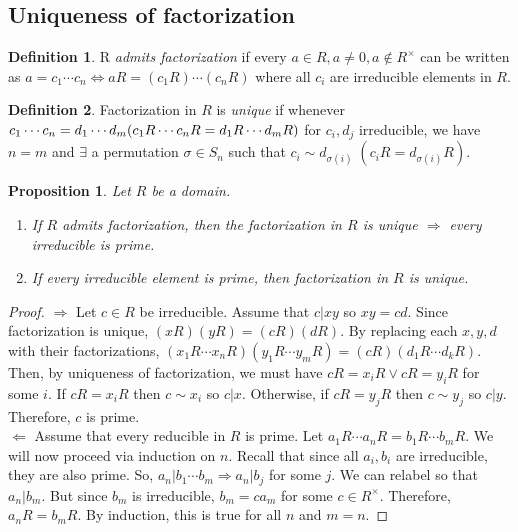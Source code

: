 \documentclass{article}
\theoremstyle{definition}
\newtheorem{definition}{Definition}[subsection]
\theoremstyle{remark}
\theoremstyle{plain}
\newtheorem{prop}{Proposition}[subsection]
\begin{document}
\subsection{Uniqueness of factorization}

\begin{definition}
    R \emph{admits factorization} if every \(a \in R, a\neq 0, a\notin R^{\times}\) can be written
    as \(a = c_1\cdots c_n \iff aR = (c_1R)\cdots(c_nR)\) where all \(c_i\) are irreducible elements in \(R\).
\end{definition}

\begin{definition}
    Factorization in \(R\) is \emph{unique} if whenever \(c_1\cdots c_n = d_1\cdots d_m \\(c_1R\cdots c_nR = d_1R\cdots d_mR)\) for \(c_i, d_j\) irreducible, we have \(n = m\) and \(\exists\)
    a permutation \(\sigma \in S_n\) such that \(c_i \sim d_{\sigma(i)}\; (c_iR = d_{\sigma(i)}R)\).
\end{definition}

\begin{prop}
    Let \(R\) be a domain. 
    \begin{enumerate}
        \item If \(R\) admits factorization, then the factorization in \(R\) is unique \(\Rightarrow\) every irreducible is prime.
        \item If every irreducible element is prime, then factorization in \(R\) is unique. 
    \end{enumerate}
\end{prop}

\begin{proof}
    \(\Rightarrow\) Let \(c \in R\) be irreducible. Assume that \(c|xy\) so \(xy = cd\). Since factorization is unique, \((xR)(yR) = (cR)(dR)\). By replacing each \(x, y, d\) with their factorizations,
    \((x_1R\cdots x_nR)(y_1R\cdots y_mR) = (cR)(d_1R \cdots d_kR)\). Then, by uniqueness of factorization, we must have \(cR = x_iR \lor cR = y_iR\) for some \(i\). If \(cR = x_iR\) then \(c\sim x_i\) 
    so \(c|x\). Otherwise, if \(cR = y_jR\) then \(c \sim y_j\) so \(c|y\). Therefore, \(c\) is prime.\\
    \(\Leftarrow\) Assume that every reducible in \(R\) is prime. Let \(a_1R\cdots a_nR = b_1R\cdots b_mR\). We will now proceed via
    induction on \(n\). Recall that since all \(a_i, b_i\) are irreducible, they are also prime. So, \(a_n | b_1\cdots b_m \Rightarrow a_n | b_j\)
    for some \(j\). We can relabel so that \(a_n|b_m\). But since \(b_m\) is irreducible, \(b_m = ca_m\) for some \(c \in R^{\times}\).
    Therefore, \(a_nR = b_mR\). By induction, this is true for all \(n\) and \(m = n\).
\end{proof}
\end{document}

